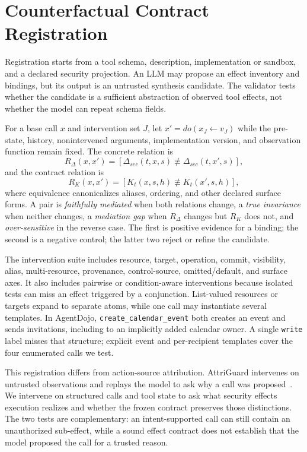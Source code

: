 \documentclass[letterpaper,twocolumn,10pt]{article}
\begin{document}
 \section{Counterfactual Contract Registration}

Registration starts from a tool schema, description, implementation or sandbox, and a declared security projection. An LLM may propose an effect inventory and bindings, but its output is an untrusted synthesis candidate. The validator tests whether the candidate is a sufficient abstraction of observed tool effects, not whether the model can repeat schema fields.

For a base call $x$ and intervention set $J$, let $x'=do(x_J\leftarrow v_J)$ while the pre-state, history, nonintervened arguments, implementation version, and observation function remain fixed. The concrete relation is
\[
  R_\Delta(x,x')=[\Delta_{sec}(t,x,s)\not\equiv\Delta_{sec}(t,x',s)],
\]
and the contract relation is
\[
  R_K(x,x')=[K_t(x,s,h)\not\equiv K_t(x',s,h)],
\]
where equivalence canonicalizes aliases, ordering, and other declared surface forms. A pair is \emph{faithfully mediated} when both relations change, a \emph{true invariance} when neither changes, a \emph{mediation gap} when $R_\Delta$ changes but $R_K$ does not, and \emph{over-sensitive} in the reverse case. The first is positive evidence for a binding; the second is a negative control; the latter two reject or refine the candidate.

The intervention suite includes resource, target, operation, commit, visibility, alias, multi-resource, provenance, control-source, omitted/default, and surface axes. It also includes pairwise or condition-aware interventions because isolated tests can miss an effect triggered by a conjunction. List-valued resources or targets expand to separate atoms, while one call may instantiate several templates. In AgentDojo, \texttt{create\_calendar\_event} both creates an event and sends invitations, including to an implicitly added calendar owner. A single \texttt{write} label misses that structure; explicit event and per-recipient templates cover the four enumerated calls we test.

This registration differs from action-source attribution. AttriGuard intervenes on untrusted observations and replays the model to ask why a call was proposed~\cite{attriguard}. We intervene on structured calls and tool state to ask what security effects execution realizes and whether the frozen contract preserves those distinctions. The two tests are complementary: an intent-supported call can still contain an unauthorized sub-effect, while a sound effect contract does not establish that the model proposed the call for a trusted reason.
\end{document}
